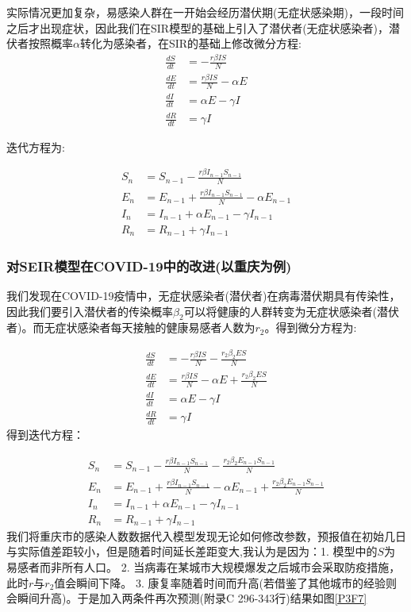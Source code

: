 \documentclass[a4paper, 11pt,twoside=true,UTF8]{scrartcl}
\begin{document}
实际情况更加复杂，易感染人群在一开始会经历潜伏期(无症状感染期)，一段时间之后才出现症状，因此我们在SIR模型的基础上引入了潜伏者(无症状感染者)，潜伏者按照概率$\alpha$转化为感染者，在SIR的基础上修改微分方程:
$$
\begin{aligned}
\frac{dS}{dt}&=-\frac{r\beta IS}{N}\\ 
\frac{dE}{dt}&=\frac{r\beta IS}{N}-\alpha E\\ 
\frac{dI}{dt}&=\alpha E-\gamma I\\ 
\frac{dR}{dt}&=\gamma I
\end{aligned}
$$

迭代方程为:

$$
\begin{aligned}
S_n&=S_{n-1}-\frac{r\beta I_{n-1}S_{n-1}}{N}\\ 
E_n&=E_{n-1}+\frac{r\beta I_{n-1}S_{n-1}}{N}-\alpha E_{n-1}\\ 
I_n&=I_{n-1} +\alpha E_{n-1}-\gamma I_{n-1}\\ 
R_n&=R_{n-1}+\gamma I_{n-1}
\end{aligned}
$$

\subsubsection{对SEIR模型在COVID-19中的改进(以重庆为例)}
我们发现在COVID-19疫情中，无症状感染者(潜伏者)在病毒潜伏期具有传染性，因此我们要引入潜伏者的传染概率$\beta_2$可以将健康的人群转变为无症状感染者(潜伏者)。而无症状感染者每天接触的健康易感者人数为$r_2$。得到微分方程为:

$$
\begin{aligned}
	\frac{dS}{dt}&=-\frac{r\beta IS}{N}-\frac{r_2 \beta_2ES}{N} \\
	\frac{dE}{dt}&=\frac{r\beta IS}{N}-\alpha E+\frac{r_2 \beta_2ES}{N}  \\ 
	\frac{dI}{dt}&=\alpha E-\gamma I  \\ 
	\frac{dR}{dt}&=\gamma I
\end{aligned}
$$
得到迭代方程：

$$
\begin{aligned}
S_n&=S_{n-1}-\frac{r\beta I_{n-1}S_{n-1}}{N}-\frac{r_2\beta_2 E_{n-1}S_{n-1}}{N}  \\
E_n&=E_{n-1}+\frac{r\beta I_{n-1}S_{n-1}}{N}-\alpha E_{n-1}+\frac{r_2\beta_2 E_{n-1}S_{n-1}}{N}  \\ 
I_n&=I_{n-1} +\alpha E_{n-1}-\gamma I_{n-1}  \\ 
R_n&=R_{n-1}+\gamma I_{n-1}
\end{aligned}
$$
我们将重庆市的感染人数数据代入模型发现无论如何修改参数，预报值在初始几日与实际值差距较小，但是随着时间延长差距变大,我认为是因为：1. 模型中的$S$为易感者而非所有人口。 2. 当病毒在某城市大规模爆发之后城市会采取防疫措施，此时$r$与$r_2$值会瞬间下降。 3. 康复率随着时间而升高(若借鉴了其他城市的经验则会瞬间升高)。于是加入两条件再次预测(附录C 296-343行)结果如图\ref{P3F7}
\end{document}
